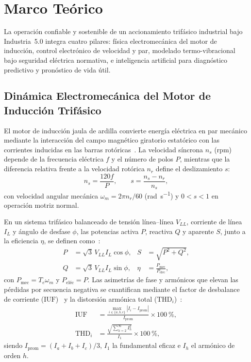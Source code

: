\section{Marco Teórico}\label{sec:marco_teorico}

La operación confiable y sostenible de un accionamiento trifásico industrial bajo Industria~5.0 integra cuatro pilares: física electromecánica del motor de inducción, control electrónico de velocidad y par, modelado termo-vibracional bajo seguridad eléctrica normativa, e inteligencia artificial para diagnóstico predictivo y pronóstico de vida útil.

\subsection{Dinámica Electromecánica del Motor de Inducción Trifásico}\label{subsec:dinamica_motor}

El motor de inducción jaula de ardilla convierte energía eléctrica en par mecánico mediante la interacción del campo magnético giratorio estatórico con las corrientes inducidas en las barras rotóricas~\cite{Chapman2012,Fitzgerald2003}. La velocidad síncrona $n_s$ (\unit{rpm}) depende de la frecuencia eléctrica $f$ y el número de polos $P$, mientras que la diferencia relativa frente a la velocidad rotórica $n_r$ define el deslizamiento $s$:
\begin{equation}
n_s = \frac{120 f}{P}, \qquad s = \frac{n_s - n_r}{n_s},
\label{eq:ns_deslizamiento}
\end{equation}
con velocidad angular mecánica $\omega_m = 2\pi n_r/\num{60}$ (\unit{\radian\per\second}) y $0 < s < 1$ en operación motriz normal.

En un sistema trifásico balanceado de tensión línea--línea $V_{LL}$, corriente de línea $I_L$ y ángulo de desfase $\phi$, las potencias activa $P$, reactiva $Q$ y aparente $S$, junto a la eficiencia $\eta$, se definen como~\cite{Chapman2012,IEC60034}:
\begin{equation}
\begin{aligned}
P &= \sqrt{3}\,V_{LL} I_L \cos\phi, & S &= \sqrt{P^2 + Q^2}, \\
Q &= \sqrt{3}\,V_{LL} I_L \sin\phi, & \eta &= \frac{P_{\text{mec}}}{P_{\text{eléc}}},
\end{aligned}
\label{eq:potencias_trifasicas}
\end{equation}
con $P_{\text{mec}} = T_e\omega_m$ y $P_{\text{eléc}} = P$. Las asimetrías de fase y armónicos que elevan las pérdidas por secuencia negativa se cuantifican mediante el factor de desbalance de corriente ($\text{IUF}$)~\cite{IEEE112} y la distorsión armónica total ($\text{THD}_i$)~\cite{IEEE519}:
\begin{equation}
\begin{aligned}
\text{IUF} &= \frac{\max_{i \in \{a,b,c\}} |I_i - I_{\text{prom}}|}{I_{\text{prom}}} \times \qty{100}{\percent}, \\
\text{THD}_i &= \frac{\sqrt{\sum_{h=2}^{\infty} I_h^2}}{I_1} \times \qty{100}{\percent},
\end{aligned}
\label{eq:iuf_thd}
\end{equation}
siendo $I_{\text{prom}} = (I_a + I_b + I_c)/3$, $I_1$ la fundamental eficaz e $I_h$ el armónico de orden $h$.

